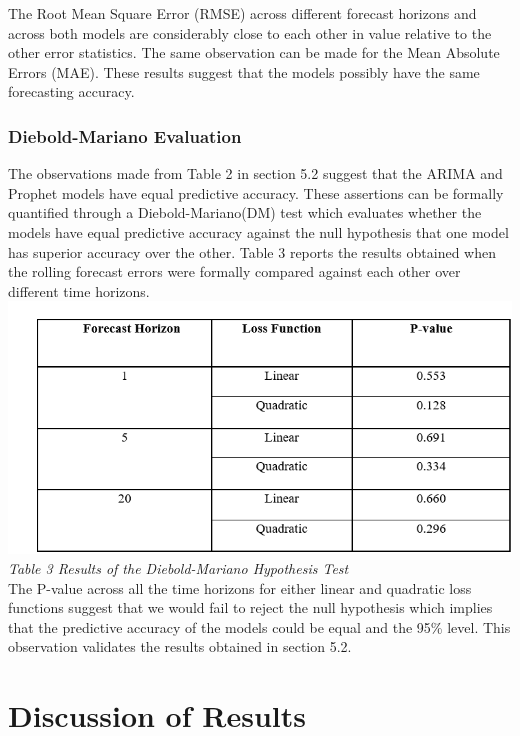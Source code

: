 \documentclass[12pt,a4paper]{article}
\numberwithin{equation}{section}
\numberwithin{figure}{section}
\numberwithin{table}{section}
\begin{document}
The Root Mean Square Error (RMSE) across different forecast horizons and
across both models are considerably close to each other in value
relative to the other error statistics. The same observation can be made
for the Mean Absolute Errors (MAE). These results suggest that the
models possibly have the same forecasting accuracy.

\subsubsection{Diebold-Mariano
Evaluation}\label{diebold-mariano-evaluation-1}

The observations made from Table 2 in section 5.2 suggest that the ARIMA
and Prophet models have equal predictive accuracy. These assertions can
be formally quantified through a Diebold-Mariano(DM) test which
evaluates whether the models have equal predictive accuracy against the
null hypothesis that one model has superior accuracy over the other.
Table 3 reports the results obtained when the rolling forecast errors
were formally compared against each other over different time
horizons.\\
\includegraphics[width=1.05000\textwidth]{dm results.png}\\
\emph{Table 3 Results of the Diebold-Mariano Hypothesis Test}\\
The P-value across all the time horizons for either linear and quadratic
loss functions suggest that we would fail to reject the null hypothesis
which implies that the predictive accuracy of the models could be equal
and the 95\% level. This observation validates the results obtained in
section 5.2.

\section{Discussion of Results}\label{discussion-of-results}
\end{document}
